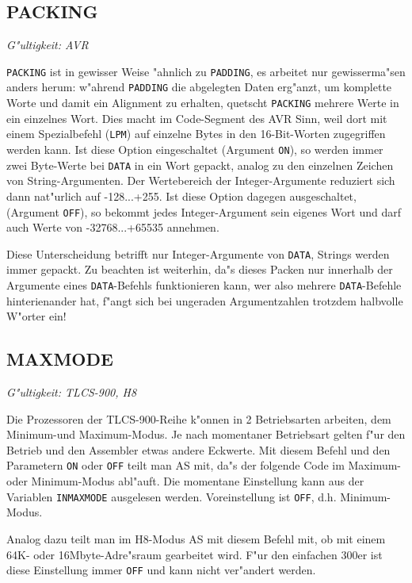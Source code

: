 \documentclass[12pt,a4paper,twoside]{report}
\makeatletter
\newcommand{\tty}[1]{{\tt #1}}
\newcommand{\ttindex}[1]{\index{#1@{\tt #1}}}
\makeatother
\begin{document}

\subsection{PACKING}
\ttindex{PACKING}

{\em G"ultigkeit: AVR}

{\tt PACKING} ist in gewisser Weise "ahnlich zu {\tt PADDING}, es arbeitet
nur gewisserma"sen anders herum: w"ahrend {\tt PADDING} die
abgelegten Daten erg"anzt, um komplette Worte und damit ein Alignment zu
erhalten, quetscht {\tt PACKING} mehrere Werte in ein einzelnes Wort.
Dies macht im Code-Segment des AVR Sinn, weil dort mit einem Spezialbefehl
({\tt LPM}) auf einzelne Bytes in den 16-Bit-Worten zugegriffen werden
kann.  Ist diese Option eingeschaltet (Argument {\tt ON}), so werden immer
zwei Byte-Werte bei {\tt DATA} in ein Wort gepackt, analog zu den
einzelnen Zeichen von String-Argumenten.  Der Wertebereich der
Integer-Argumente reduziert sich dann nat"urlich auf -128...+255.  Ist
diese Option dagegen ausgeschaltet, (Argument {\tt OFF}), so bekommt
jedes Integer-Argument sein eigenes Wort und darf auch Werte von
-32768...+65535 annehmen.

Diese Unterscheidung betrifft nur Integer-Argumente von {\tt DATA},
Strings werden immer gepackt.  Zu beachten ist weiterhin, da"s dieses
Packen nur innerhalb der Argumente eines {\tt DATA}-Befehls funktionieren
kann, wer also mehrere {\tt DATA}-Befehle hinterienander hat, f"angt sich
bei ungeraden Argumentzahlen trotzdem halbvolle W"orter ein!


\subsection{MAXMODE}
\ttindex{MAXMODE}

{\em G"ultigkeit: TLCS-900, H8}

Die Prozessoren der TLCS-900-Reihe k"onnen in 2 Betriebsarten arbeiten,
dem Minimum-und Maximum-Modus.  Je nach momentaner Betriebsart gelten
f"ur den Betrieb und den Assembler etwas andere Eckwerte.  Mit diesem Befehl
und den Parametern \tty{ON} oder \tty{OFF} teilt man AS mit, da"s der
folgende Code im Maximum- oder Minimum-Modus abl"auft.  Die momentane
Einstellung kann aus der Variablen \tty{INMAXMODE} ausgelesen werden.
Voreinstellung ist \tty{OFF}, d.h. Minimum-Modus.
\par
Analog dazu teilt man im H8-Modus AS mit diesem Befehl mit, ob
mit einem 64K- oder 16Mbyte-Adre"sraum gearbeitet wird.  F"ur den
einfachen 300er ist diese Einstellung immer \tty{OFF} und kann nicht
ver"andert werden.
\end{document}
